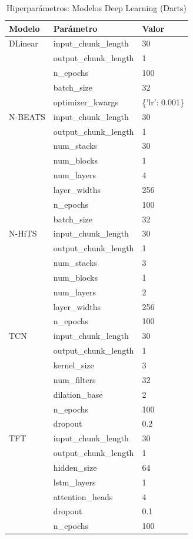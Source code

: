 \begin{table}[htbp]
\centering
\caption{Hiperpar\'ametros: Modelos Deep Learning (Darts)}
\label{tab:hyper_dl}
\small
\begin{tabular}{@{}llp{6cm}@{}}
\toprule
\textbf{Modelo} & \textbf{Par\'ametro} & \textbf{Valor} \\
\midrule
DLinear & input\_chunk\_length & 30 \\
 & output\_chunk\_length & 1 \\
 & n\_epochs & 100 \\
 & batch\_size & 32 \\
 & optimizer\_kwargs & \{'lr': 0.001\} \\
\midrule
N-BEATS & input\_chunk\_length & 30 \\
 & output\_chunk\_length & 1 \\
 & num\_stacks & 30 \\
 & num\_blocks & 1 \\
 & num\_layers & 4 \\
 & layer\_widths & 256 \\
 & n\_epochs & 100 \\
 & batch\_size & 32 \\
\midrule
N-HiTS & input\_chunk\_length & 30 \\
 & output\_chunk\_length & 1 \\
 & num\_stacks & 3 \\
 & num\_blocks & 1 \\
 & num\_layers & 2 \\
 & layer\_widths & 256 \\
 & n\_epochs & 100 \\
\midrule
TCN & input\_chunk\_length & 30 \\
 & output\_chunk\_length & 1 \\
 & kernel\_size & 3 \\
 & num\_filters & 32 \\
 & dilation\_base & 2 \\
 & n\_epochs & 100 \\
 & dropout & 0.2 \\
\midrule
TFT & input\_chunk\_length & 30 \\
 & output\_chunk\_length & 1 \\
 & hidden\_size & 64 \\
 & lstm\_layers & 1 \\
 & attention\_heads & 4 \\
 & dropout & 0.1 \\
 & n\_epochs & 100 \\
\bottomrule
\end{tabular}
\end{table}

